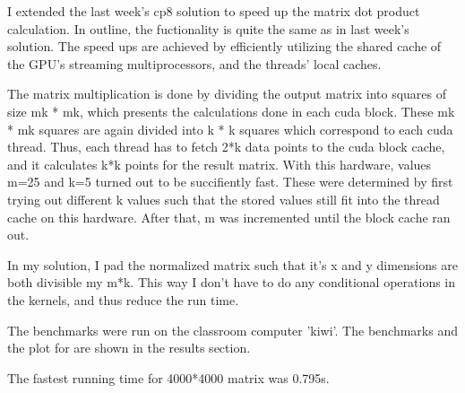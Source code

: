 I extended the last week's cp8 solution to speed up the matrix dot product calculation. In outline, the fuctionality is quite the same as in last week's solution. The speed ups are achieved by efficiently utilizing the shared cache of the GPU's streaming multiprocessors, and the threads' local caches.

The matrix multiplication is done by dividing the output matrix into squares of size mk * mk, which presents the calculations done in each cuda block. These mk * mk squares are again divided into k * k squares which correspond to each cuda thread. Thus, each thread has to fetch 2*k data points to the cuda block cache, and it calculates k*k points for the result matrix. With this hardware, values m=25 and k=5 turned out to be succifiently fast. These were determined by first trying out different k values such that the stored values still fit into the thread cache on this hardware. After that, m was incremented until the block cache ran out.

In my solution, I pad the normalized matrix such that it's x and y dimensions are both divisible my m*k. This way I don't have to do any conditional operations in the kernels, and thus reduce the run time.

The benchmarks were run on the classroom computer 'kiwi'. The benchmarks and the plot for are shown in the results section.

The fastest running time for 4000*4000 matrix was 0.795s.

